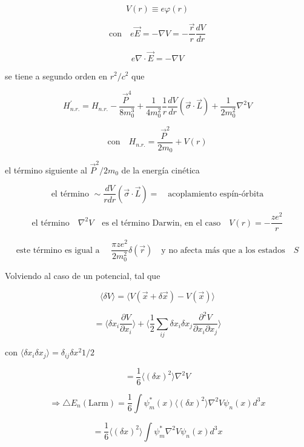 \documentclass{report}
\begin{document}
\begin{equation}
V(r) \equiv e \varphi (r) 
\end{equation}

\[\text{con} \quad e \overrightarrow{E} = - \nabla V = - \frac{\vec{r}}{r} \frac{dV}{dr }\]

\[e \nabla \cdot \overrightarrow{E} = - \nabla V \]

se tiene a segundo orden en $r^2/c^2 $ que

\begin{equation}
H^{\prime}_{n.r.} = H_{n.r.} - \frac{\overrightarrow{P}^4}{8 m_{0}^{3}} + \frac{1}{4m_{0}^2} \frac{1}{r} \frac{dV}{dr} (\overrightarrow{\sigma} \cdot \overrightarrow{L}) + \frac{1}{2m_{0}^2} \nabla^2 V
\end{equation}

\[\text{con} \quad H_{n.r. } = \frac{\overrightarrow{P}^2}{2m_0 } + V(r) \]

 el t\'ermino siguiente al $\overrightarrow{P}^2 / 2m_0$ de la energ\'ia cin\'etica

\[\text{el t\'ermino } \sim \frac{dV}{rdr} (\overrightarrow{\sigma} \cdot \overrightarrow{L}) = \quad \text{acoplamiento espín-órbita}\]

\[\text{el t\'ermino} \quad \nabla^2 V \quad \text{es el término Darwin, en el caso} \quad V(r) = - \frac{z e^2}{r} \]

\[\text{este término es igual a } \quad \frac{\pi z e^2 }{2 m_{0}^{2}} \delta (\overrightarrow{r}) \quad \text{y no afecta más que a los estados} \quad  S \]

Volviendo al caso de un potencial, tal que

\[\langle \delta V \rangle = \langle V (\overrightarrow{x} + \delta \overrightarrow{x}) -V(\overrightarrow{x}) \rangle \]

\[ = \langle \delta x_i \frac{\partial V }{\partial x_i } \rangle + \langle \frac{1}{2} \sum_{ij} \delta x_i \delta x_j \frac{\partial ^2 V}{\partial x_i \partial x_j } \rangle \]

con $\langle \delta x_i \delta x_j \rangle = \delta _{ij} \delta x^2 1/2$

\[= \frac{1}{6} \langle (\delta x)^2 \rangle \nabla ^2 V \]

\[\Rightarrow \bigtriangleup E_n (\text{Larm} ) = \frac{1}{6} \int \psi^{*}_{m}(x) \langle (\delta x)^2 \rangle \nabla^2 V \psi_{n} (x) d^3 x\]

\[= \frac{1}{6} \langle (\delta x)^2 \rangle \int \psi^{*}_{m} \nabla^2 V \psi_{n} (x) d^3 x\]
\end{document}
